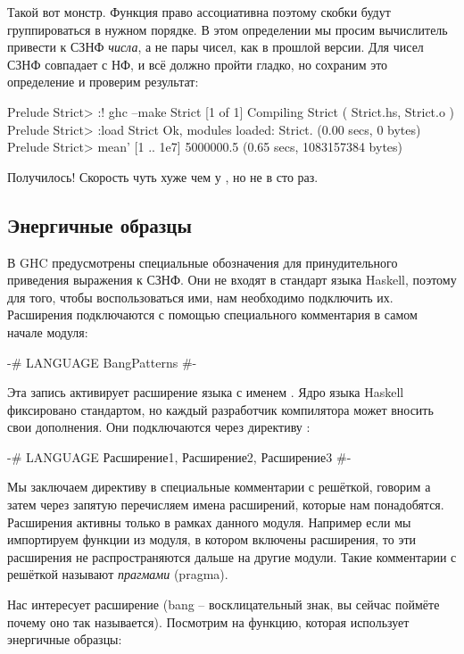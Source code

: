 Такой вот монстр. Функция  право ассоциативна
поэтому скобки будут группироваться в нужном порядке.
В этом определении мы просим вычислитель привести
к СЗНФ \emph{числа}, а не пары чисел, как в прошлой версии.
Для чисел СЗНФ совпадает с НФ, и всё должно пройти гладко,
но сохраним это определение и проверим результат:

\begin{code}
Prelude Strict> :! ghc --make Strict
[1 of 1] Compiling Strict           ( Strict.hs, Strict.o )
Prelude Strict> :load Strict
Ok, modules loaded: Strict.
(0.00 secs, 0 bytes)
Prelude Strict> mean' [1 .. 1e7]
5000000.5
(0.65 secs, 1083157384 bytes)
\end{code}

Получилось! Скорость чуть хуже чем у , но не в сто раз.


\subsection{Энергичные образцы}

В GHC предусмотрены специальные обозначения для 
принудительного приведения выражения к СЗНФ. Они не входят
в стандарт языка Haskell, поэтому для того, чтобы
воспользоваться ими, нам необходимо подключить их. 
Расширения подключаются с помощью специального
комментария в самом начале модуля:

\begin{code}
{-# LANGUAGE BangPatterns #-}
\end{code}

Эта запись активирует расширение языка с именем .
Ядро языка Haskell фиксировано стандартом, но каждый разработчик
компилятора может вносить свои дополнения. Они подключаются 
через директиву :

\begin{code}
{-# LANGUAGE 
        Расширение1, 
        Расширение2, 
        Расширение3 #-}
\end{code}

Мы заключаем директиву в специальные комментарии с решёткой,
говорим  а затем через запятую перечисляем
имена расширений, которые нам понадобятся. Расширения активны 
только в рамках данного модуля. Например если мы импортируем
функции из модуля, в котором включены расширения, то эти
расширения не распространяются дальше на другие модули. 
Такие комментарии с решёткой называют \emph{прагмами} (pragma).

Нас интересует расширение  (bang -- восклицательный
знак, вы сейчас поймёте почему оно так называется). 
Посмотрим на функцию, которая использует энергичные образцы:

